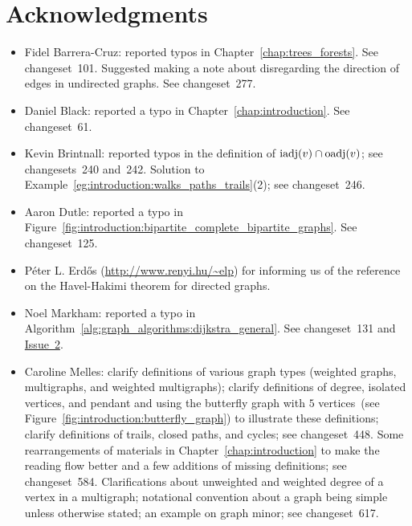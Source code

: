 
\chapter{Acknowledgments}

\begin{itemize}
\item Fidel Barrera-Cruz: reported typos in
  Chapter~\ref{chap:trees_forests}. See changeset~101. Suggested
  making a note about disregarding the direction of edges in
  undirected graphs. See changeset~277.

\item Daniel Black: reported a typo in
  Chapter~\ref{chap:introduction}. See changeset~61.

\item Kevin Brintnall: reported typos in the definition of
  $\operatorname*{iadj}(v) \cap \operatorname*{oadj}(v)$; see changesets~240 and~242. Solution to
  Example~\ref{eg:introduction:walks_paths_trails}(2); see changeset~246.

\item Aaron Dutle: reported a typo in
  Figure~\ref{fig:introduction:bipartite_complete_bipartite_graphs}. See
  changeset~125.

\item P\'eter L. Erd\H{o}s (\url{http://www.renyi.hu/~elp}) for informing
  us of the reference~\cite{ErdosEtAl2010} on the Havel-Hakimi
  theorem for directed graphs.

\item Noel Markham: reported a typo in
  Algorithm~\ref{alg:graph_algorithms:dijkstra_general}. See
  changeset~131 and
  \href{http://code.google.com/p/graph-theory-algorithms-book/issues/detail?id=2}{Issue~2}.

\item Caroline Melles: clarify definitions of various graph types
  (weighted graphs, multigraphs, and weighted multigraphs); clarify
  definitions of degree, isolated vertices, and pendant and using the
  butterfly graph with $5$ vertices~(see
  Figure~\ref{fig:introduction:butterfly_graph}) to
  illustrate these definitions; clarify definitions of trails, closed
  paths, and cycles; see changeset~448. Some rearrangements of
  materials in Chapter~\ref{chap:introduction} to make the reading
  flow better and a few additions of missing definitions; see
  changeset~584. Clarifications about unweighted and weighted
  degree of a vertex in a multigraph; notational convention about a
  graph being simple unless otherwise stated; an example on graph
  minor; see changeset~617.


\end{itemize}
